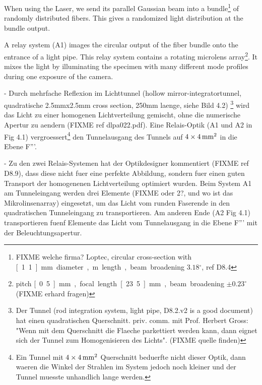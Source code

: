 When using the Laser, we send its parallel Gaussian beam into a
bundle\footnote{FIXME welche firma? Loptec, circular cross-section
  with \unit[1.1]{mm} diameter, \unit[2]{m} length, beam broadening
  $3.18{}^\circ$, ref D8.4} of randomly distributed fibers. This gives
a randomized light distribution at the bundle output.

A relay system (A1) images the circular output of the fiber bundle
onto the entrance of a light pipe. This relay system contains a
rotating microlens array\footnote{pitch \unit[0.5]{mm}, focal length
  \unit[23.5]{mm}, beam broadening $\pm 0.23^\circ$ (FIXME erhard
  fragen)}. It mixes the light by illuminating the specimen with many
different mode profiles during one exposure of the camera.
   


 - Durch mehrfache Reflexion im Lichttunnel (hollow
   mirror-integratortunnel, quadratische 2.5mmx2.5mm cross section,  %
   250mm laenge, siehe Bild 4.2) \footnote{Der
   Tunnel (rod integration system, light pipe, D8.2.v2 is a good
   document) hat einen quadratischen Querschnitt. priv. comm. mit
   Prof. Herbert Gross: "Wenn mit dem Querschnitt die Flaeche
   parkettiert werden kann, dann eignet sich der Tunnel zum
   Homogenisieren des Lichts". (FIXME quelle finden)} wird das Licht
   zu einer homogenen Lichtverteilung gemischt, ohne die numerische
   Apertur zu aendern (FIXME ref dlpa022.pdf).  Eine Relais-Optik (A1
   und A2 in Fig 4.1) vergroessert\footnote{Ein Tunnel mit $\unit[4\times4]{mm^2}$
   Querschnitt beduerfte nicht dieser Optik, dann waeren die Winkel
   der Strahlen im System jedoch noch kleiner und der Tunnel muesste
   unhandlich lange werden.} 
   den Tunnelausgang des Tunnels auf $\unit[4\times4]{mm^2}$
   in die Ebene F'''.




 - Zu den zwei Relais-Systemen hat der Optikdesigner kommentiert
   (FIXME ref D8.9), dass diese nicht fuer eine perfekte Abbildung,
   sondern fuer einen guten Transport der homogenenen Lichtverteilung    %
   optimiert wurden. Beim System A1 am Tunneleingang werden drei Elemente
   (FIXME oder 2?, und wo ist das Mikrolinsenarray) eingesetzt, um das
   Licht vom runden Faserende in den quadratischen Tunneleingang zu
   transportieren. Am anderen Ende (A2 Fig 4.1) transportieren fuenf Elemente das
   Licht vom Tunnelausgang in die Ebene F''' mit der
   Beleuchtungsapertur.

